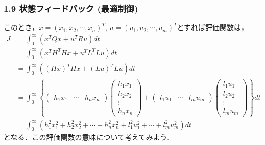 \documentclass[10pt]{beamer}
\begin{document}
\begin{frame}[t]
\frametitle{1.9 状態フィードバック (最適制御)}
このとき，$x = (x_1, x_2, \cdots, x_n)^T$, $u = (u_1, u_2, \cdots, u_m)^T$とすれば評価関数は，
{\footnotesize
\begin{align}
 J
 &= \int_{0}^{\infty} (x^T Q x + u^T R u) dt \nonumber \\
 &= \int_{0}^{\infty} (x^T H^TH x + u^T L^TL u) dt \nonumber \\
 &= \int_{0}^{\infty} ((Hx)^TH x + (Lu)^TL u) dt \nonumber \\
 &= \int_{0}^{\infty}
    \left\{
    \left(
    \begin{array}{cccc}
     h_1x_1 & \cdots & h_nx_n
    \end{array}
    \right)
    \left(
    \begin{array}{c}
     h_1x_1 \\
     h_2x_2 \\
     \vdots \\
     h_nx_n
    \end{array}
    \right) +
    \left(
    \begin{array}{cccc}
     l_1u_1 & \cdots & l_mu_m
    \end{array}
    \right)
    \left(
    \begin{array}{c}
     l_1u_1 \\
     l_2u_2 \\
     \vdots \\
     l_mu_m
    \end{array}
    \right)
    \right\}dt \nonumber \\
 &= \int_0^{\infty} (h_1^2 x_1^2 + h_2^2 x_2^2 + \cdots +
     h_n^2 x_n^2 + l_1^2 u_1^2 + \cdots + l_m^2 u_m^2)dt

\end{align}
}
となる．この評価関数の意味について考えてみよう．
\end{frame}
\end{document}
